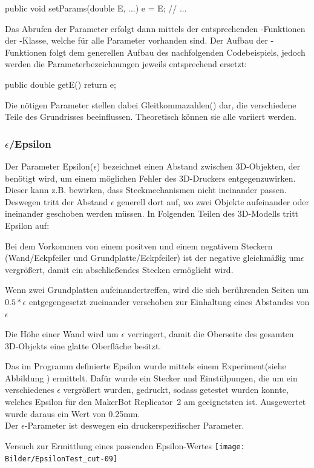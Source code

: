\begin{code} 
	public void setParams(double E, ...){
		e = E;
		// ...
	}
\end{code}

Das Abrufen der Parameter erfolgt dann mittels der entsprechenden -Funktionen der -Klasse, welche für alle Parameter vorhanden sind.
Der Aufbau der -Funktionen folgt dem generellen Aufbau des nachfolgenden Codebeispiels, jedoch werden die Parameterbezeichnungen jeweils entsprechend ersetzt:\\

\begin{code} 
public double getE() {
	return e;
}
\end{code}

Die nötigen Parameter stellen dabei Gleitkommazahlen() dar, die verschiedene Teile des Grundrisses beeinflussen. 
Theoretisch können sie alle variiert werden.

\subsubsection{$\epsilon$/Epsilon}
Der Parameter Epsilon($\epsilon$) bezeichnet einen Abstand zwischen 3D-Objekten, der benötigt wird, um einem möglichen Fehler des 3D-Druckers entgegenzuwirken.
Dieser kann z.B. bewirken, dass Steckmechanismen nicht ineinander passen.
Deswegen tritt der Abstand $\epsilon$ generell dort auf, wo zwei Objekte aufeinander oder ineinander geschoben werden müssen.
In Folgenden Teilen des 3D-Modells tritt Epsilon auf:
\begin{compactenum}
	\item Bei dem Vorkommen von einem positven und einem negativem Steckern (Wand/Eckpfeiler und Grundplatte/Eckpfeiler) ist der negative gleichmäßig um$\epsilon$ vergrößert, damit ein abschließendes Stecken ermöglicht wird.
	\item Wenn zwei Grundplatten aufeinandertreffen, wird die sich berührenden Seiten um $0.5*\epsilon$ entgegengesetzt zueinander verschoben zur Einhaltung eines Abstandes von $\epsilon$ 
	\item Die Höhe einer Wand wird um $\epsilon$ verringert, damit die Oberseite des gesamten 3D-Objekts eine glatte Oberfläche besitzt.
\end{compactenum}

Das im Programm definierte Epsilon wurde mittels einem Experiment(siehe Abbildung \thebildnr) ermittelt.
Dafür wurde ein Stecker und Einstülpungen, die um ein verschiedenes $\epsilon$ vergrößert wurden, gedruckt, sodass getestet wurden konnte, welches Epsilon für den MakerBot Replicator\texttrademark\ 2 am geeignetsten ist.
Ausgewertet wurde daraus ein Wert von 0.25mm. \\
Der $\epsilon$-Parameter ist deswegen ein druckerspezifischer Parameter.
\begin{Bild}{Versuch zur Ermittlung eines passenden Epsilon-Wertes}
		\texttt{[image: Bilder/EpsilonTest\_cut-09]}
\end{Bild}

